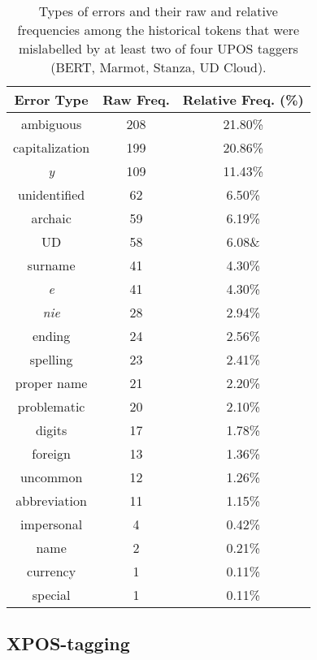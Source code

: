 \renewcommand{\arraystretch}{1.25}
\begin{table}[H]
\begin{center}
\begin{tabular}{|c|cc|}
\hline \bf Error Type & \bf Raw Freq. & \bf Relative Freq. (\%) \\ \hline
ambiguous & 208 & 21.80\% \\
capitalization & 199 & 20.86\% \\
\textit{y} & 109 & 11.43\%  \\
unidentified & 62 & 6.50\% \\
archaic & 59 & 6.19\% \\
UD & 58 & 6.08\& \\
surname & 41 & 4.30\% \\
\textit{e} & 41 & 4.30\% \\
\textit{nie} & 28 & 2.94\% \\
ending & 24 & 2.56\% \\
spelling & 23 & 2.41\% \\
proper name & 21 & 2.20\% \\
problematic & 20 & 2.10\% \\
digits & 17 & 1.78\% \\
foreign & 13 & 1.36\% \\
uncommon & 12 & 1.26\% \\
abbreviation & 11 & 1.15\% \\
impersonal & 4 & 0.42\% \\
name & 2 & 0.21\% \\
currency & 1 & 0.11\% \\
special & 1 & 0.11\% \\
\hline
\end{tabular}
\caption{\label{table:pos-errors} Types of errors and their raw and relative frequencies among the historical tokens that were mislabelled by at least two of four UPOS taggers (BERT, Marmot, Stanza, UD Cloud).}
\end{center}
\end{table}

\subsection{XPOS-tagging}
\label{subsec:xpos-tagging}

